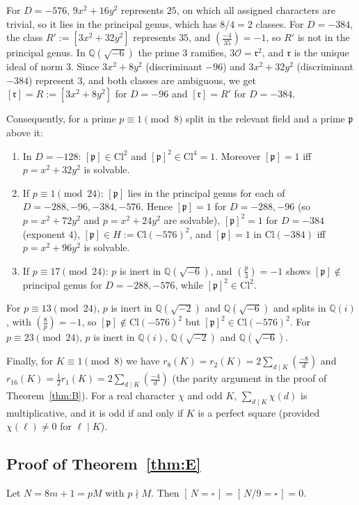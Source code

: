 \documentclass[11pt]{amsart}
\theoremstyle{definition}
\theoremstyle{remark}
\numberwithin{equation}{section}
\newcommand{\Q}{\mathbb{Q}}
\newcommand{\Ocal}{\mathcal{O}}
\newcommand{\Cl}{\mathrm{Cl}}
\newcommand{\fp}{\mathfrak{p}}
\newcommand{\fr}{\mathfrak{r}}
\newcommand{\sq}{\square}
\newcommand{\ind}[1]{[\,#1\,]}
\begin{document}
For $D=-576$, $9x^2+16y^2$ represents $25$, on which all assigned characters are trivial, so it lies in the principal genus, which has $8/4=2$ classes. For $D=-384$, the class $R':=[3x^2+32y^2]$ represents $35$, and $\left(\frac{-4}{35}\right)=-1$, so $R'$ is not in the principal genus. In $\Q(\sqrt{-6})$ the prime $3$ ramifies, $3\Ocal=\fr^2$, and $\fr$ is the unique ideal of norm $3$. Since $3x^2+8y^2$ (discriminant $-96$) and $3x^2+32y^2$ (discriminant $-384$) represent $3$, and both classes are ambiguous, we get $[\fr]=R:=[3x^2+8y^2]$ for $D=-96$ and $[\fr]=R'$ for $D=-384$.

Consequently, for a prime $p\equiv1\pmod 8$ split in the relevant field and a prime $\fp$ above it:
\begin{enumerate}[label=\textup{(G\arabic*)}]
\item In $D=-128$: $[\fp]\in\Cl^2$ and $[\fp]^2\in\Cl^4=1$. Moreover $[\fp]=1$ iff $p=x^2+32y^2$ is solvable.
\item If $p\equiv1\pmod{24}$: $[\fp]$ lies in the principal genus for each of $D=-288,-96,-384,-576$. Hence $[\fp]=1$ for $D=-288,-96$ (so $p=x^2+72y^2$ and $p=x^2+24y^2$ are solvable), $[\fp]^2=1$ for $D=-384$ (exponent $4$), $[\fp]\in H:=\Cl(-576)^2$, and $[\fp]=1$ in $\Cl(-384)$ iff $p=x^2+96y^2$ is solvable.
\item If $p\equiv17\pmod{24}$: $p$ is inert in $\Q(\sqrt{-6})$, and $\left(\frac p3\right)=-1$ shows $[\fp]\notin$ principal genus for $D=-288,-576$, while $[\fp]^2\in\Cl^2$.
\end{enumerate}
For $p\equiv 13\pmod{24}$, $p$ is inert in $\Q(\sqrt{-2})$ and $\Q(\sqrt{-6})$ and splits in $\Q(i)$, with $\left(\frac 8p\right)=-1$, so $[\fp]\notin\Cl(-576)^2$ but $[\fp]^2\in\Cl(-576)^2$. For $p\equiv23\pmod{24}$, $p$ is inert in $\Q(i)$, $\Q(\sqrt{-2})$ and $\Q(\sqrt{-6})$.

Finally, for $K\equiv1\pmod 8$ we have $r_8(K)=r_2(K)=2\sum_{d\mid K}\left(\frac{-8}{d}\right)$ and $r_{16}(K)=\frac12r_1(K)=2\sum_{d\mid K}\left(\frac{-4}{d}\right)$ (the parity argument in the proof of Theorem~\ref{thm:B}). For a real character $\chi$ and odd $K$, $\sum_{d\mid K}\chi(d)$ is multiplicative, and it is odd if and only if $K$ is a perfect square (provided $\chi(\ell)\ne0$ for $\ell\mid K$).

\subsection{Proof of Theorem~\ref{thm:E}}
Let $N=8m+1=pM$ with $p\nmid M$. Then $\ind{N=\sq}=\ind{N/9=\sq}=0$.
\end{document}
